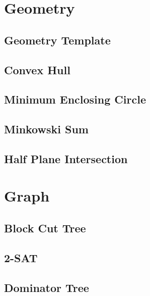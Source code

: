 \documentclass[twocolumn]{article}
\begin{document}
\section{Geometry}

\subsection{Geometry Template}


\subsection{Convex Hull}


\subsection{Minimum Enclosing Circle}


\subsection{Minkowski Sum}


\subsection{Half Plane Intersection}


\section{Graph}

\subsection{Block Cut Tree}


\subsection{2-SAT}


\subsection{Dominator Tree}

\end{document}
